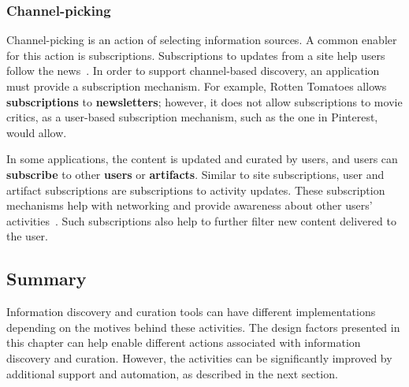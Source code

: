 {{{\subsubsection{Channel-picking}

Channel-picking is an action of selecting information sources. A common enabler for this action is subscriptions. Subscriptions to updates from a site help users follow the news~\cite{java2007feeds}. In order to support channel-based discovery, an application must provide a subscription mechanism. For example, Rotten Tomatoes allows \textbf{subscriptions} to \textbf{newsletters}; however, it does not allow subscriptions to movie critics, as a user-based subscription mechanism, such as the one in Pinterest, would allow. 

In some applications, the content is updated and curated by users, and users can \textbf{subscribe} to other \textbf{users} or \textbf{artifacts}. Similar to site subscriptions, user and artifact subscriptions are subscriptions to activity updates. These subscription mechanisms help with networking and provide awareness about other users' activities~\cite{millen2005social}. Such subscriptions also help to further filter new content delivered to the user. 
} %
} %

{\subsection{Summary}
Information discovery and curation tools can have different implementations depending on the motives behind these activities. The design factors presented in this chapter can help enable different actions associated with information discovery and curation. However, the activities can be significantly improved by additional support and automation, as described in the next section.
}
} %
\clearpage
